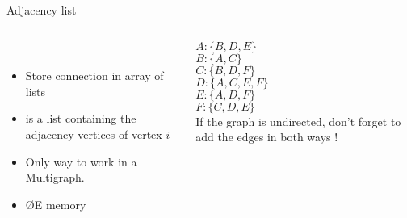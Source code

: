 \documentclass[handout,code={Graphs I},title={Introduction, DFS, BFS}]{../share/cpslide}
\begin{document}
\begin{frame}{Adjacency list}
\begin{columns}[T] %
\begin{column}[b]{0.6\linewidth}
\begin{minipage}{\linewidth}

\begin{figure}
\begin{adjustbox}{max totalsize={.4\textwidth}{.4\textheight}}
\\
\end{adjustbox}
\end{figure}

\begin{itemize}
\item Store connection in array of lists
\item {} is a list containing the adjacency vertices of vertex $i$
\item Only way to work in a Multigraph.
\item \O{E} memory 
\end{itemize}
\end{minipage}
\end{column}
\begin{column}[b]{0.4\linewidth}
\begin{minipage}{\linewidth}
$A: \{B, D, E\}$\\
$B: \{A, C\}$\\
$C: \{B, D, F\}$\\
$D: \{A, C, E, F\}$\\
$E: \{A, D, F\}$\\
$F: \{C, D, E\}$\\

If the graph is undirected, don't forget to add the edges in both ways !


\end{minipage}
\end{column}
\end{columns}


\end{frame}
\end{document}
